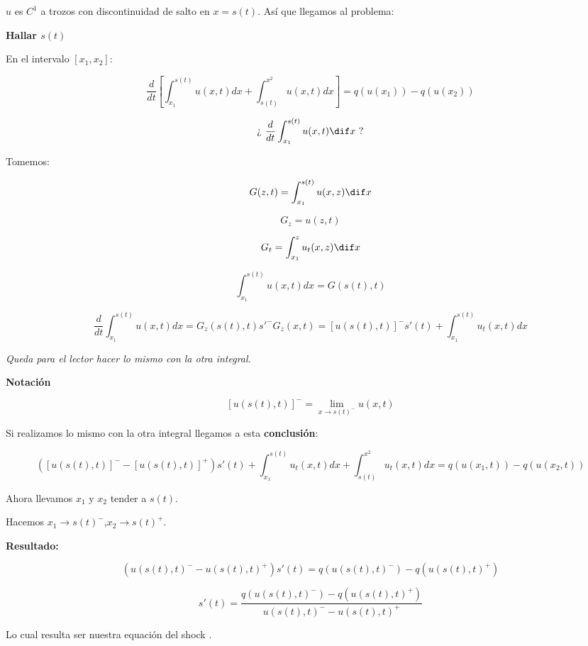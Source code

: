 		$u$ es $C^1$ a trozos con discontinuidad de salto en $x=s(t)$. Así que llegamos al problema:

		\textbf{Hallar $s(t)$}

		\begin{figure}[hbtp]
			\centering
			\caption{}
			\label{fig:discontinuidadAtasco}
		\end{figure}



		En el intervalo $[x_1,x_2]$:

		$$\frac{d}{dt} \left[ \int^{s(t)}_{x_1} u(x,t) dx + \int^{x^2}_{s(t)} u(x,t) dx \right] = q(u(x_1)) - q(u(x_2))$$


		$$ \text{¿ } \frac{d}{dt} \int^{s(t)}_{x_1} u(x,t) \dif x \text{ ?} $$

		Tomemos:

		$$G(z,t) = \int^{s(t)}_{x_1} u(x,z) \dif x $$

		$$G_z = u(z,t) $$

		$$G_t = \int^{z}_{x_1} u_t(x,z) \dif x $$

		$$\int^{s(t)}_{x_1} u(x,t) dx = G(s(t),t)$$

		$$\frac{d}{dt} \int^{s(t)}_{x_1} u(x,t) dx = G_z (s(t),t) s'^{-} G_z(x,t) = [u(s(t),t) ]^- s'(t) + \int^{s(t)}_{x_1} u_t(x,t) dx$$


		\textit{Queda para el lector hacer lo mismo con la otra integral.}


		\textbf{Notación}

		$$[u(s(t),t)]^{-} = \lim_{x \to s(t)^{-}} u(x, t) $$


		Si realizamos lo mismo con la otra integral llegamos a esta \textbf{conclusión}:

		$$([u(s(t),t)]^{-} - [u(s(t),t)]^{+}) s'(t) +  \int^{s(t)}_{x_1} u_t(x,t) dx + \int^{x^2}_{s(t)} u_t(x,t) dx = q(u(x_1,t)) - q(u(x_2,t)) $$

		Ahora llevamos $x_1$ y $x_2$ tender a $s(t)$.

		Hacemos $x_1 \rightarrow s(t)^{-}$,$x_2 \rightarrow s(t)^{+}$.


		\textbf{Resultado:}

		$$(u(s(t),t)^{-} - u(s(t),t)^{+}) s'(t) = q(u(s(t),t)^{-}) - q(u(s(t),t)^{+})$$

		$$s'(t) = \frac{q(u(s(t),t)^{-}) - q(u(s(t),t)^{+})}{u(s(t),t)^{-} - u(s(t),t)^{+}} $$

		Lo cual resulta ser nuestra equación del shock .

